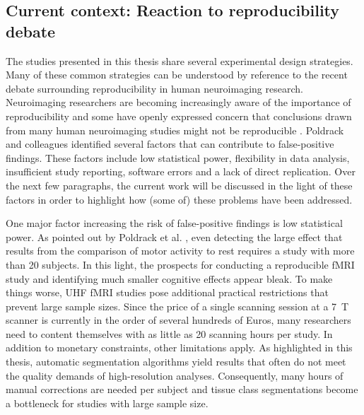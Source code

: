 \subsection{Current context: Reaction to reproducibility debate}
The studies presented in this thesis share several experimental design strategies. Many of these common strategies can be understood by reference to the recent debate surrounding reproducibility in human neuroimaging research. Neuroimaging researchers are becoming increasingly aware of the importance of reproducibility and some have openly expressed concern that conclusions drawn from many human neuroimaging studies might not be reproducible \parencite{Poldrack2017a}. Poldrack and colleagues \parencite*{Poldrack2017a} identified several factors that can contribute to false-positive findings. These factors include low statistical power, flexibility in data analysis, insufficient study reporting, software errors and a lack of direct replication. Over the next few paragraphs, the current work will be discussed in the light of these factors in order to highlight how (some of) these problems have been addressed.

One major factor increasing the risk of false-positive findings is low statistical power. As pointed out by Poldrack et al. \parencite*{Poldrack2017a}, even detecting the large effect that results from the comparison of motor activity to rest requires a study with more than 20 subjects. In this light, the prospects for conducting a reproducible fMRI study and identifying much smaller cognitive effects appear bleak. To make things worse, UHF fMRI studies pose additional practical restrictions that prevent large sample sizes. Since the price of a single scanning session at a 7~T scanner is currently in the order of several hundreds of Euros, many researchers need to content themselves with as little as 20 scanning hours per study. In addition to monetary constraints, other limitations apply. As highlighted in this thesis, automatic segmentation algorithms yield results that often do not meet the quality demands of high-resolution analyses. Consequently, many hours of manual corrections are needed per subject and tissue class segmentations become a bottleneck for studies with large sample size.

